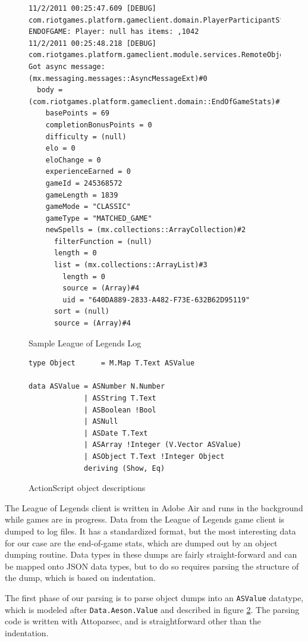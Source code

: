 \documentclass[letterpaper,twocolumn,9pt]{article}
\newcommand{\code}[1]{\texttt{#1}}
\begin{document}
\begin{figure}[]
\begin{verbatim}
11/2/2011 00:25:47.609 [DEBUG] com.riotgames.platform.gameclient.domain.PlayerParticipantStatsSummary ENDOFGAME: Player: null has items: ,1042
11/2/2011 00:25:48.218 [DEBUG] com.riotgames.platform.gameclient.module.services.RemoteObjectGenerator Got async message: (mx.messaging.messages::AsyncMessageExt)#0
  body = (com.riotgames.platform.gameclient.domain::EndOfGameStats)#1
    basePoints = 69
    completionBonusPoints = 0
    difficulty = (null)
    elo = 0
    eloChange = 0
    experienceEarned = 0
    gameId = 245368572
    gameLength = 1839
    gameMode = "CLASSIC"
    gameType = "MATCHED_GAME"
    newSpells = (mx.collections::ArrayCollection)#2
      filterFunction = (null)
      length = 0
      list = (mx.collections::ArrayList)#3
        length = 0
        source = (Array)#4
        uid = "640DA889-2833-A482-F73E-632B62D95119"
      sort = (null)
      source = (Array)#4
\end{verbatim}
    \caption{Sample League of Legends Log}
    \label{samplelog}
\end{figure}

\begin{figure}[]
\begin{verbatim}
type Object      = M.Map T.Text ASValue

data ASValue = ASNumber N.Number
             | ASString T.Text
             | ASBoolean !Bool
             | ASNull
             | ASDate T.Text
             | ASArray !Integer (V.Vector ASValue)
             | ASObject T.Text !Integer Object
             deriving (Show, Eq)
\end{verbatim}
    \caption{ActionScript object descriptions}
    \label{asvalue}
\end{figure}

The League of Legends client is written in Adobe Air and runs in the background while games are in progress. Data from the League of Legends game client is dumped to log files.  It has a standardized format, but the most interesting data for our case are the end-of-game stats, which are dumped out by an object dumping routine.  Data types in these dumps are fairly straight-forward and can be mapped onto JSON data types, but to do so requires parsing the structure of the dump, which is based on indentation.

The first phase of our parsing is to parse object dumps into an \code{ASValue} datatype, which is modeled after \code{Data.Aeson.Value} and described in figure \ref{asvalue}.  The parsing code is written with Attoparsec, and is straightforward other than the indentation.
\end{document}
